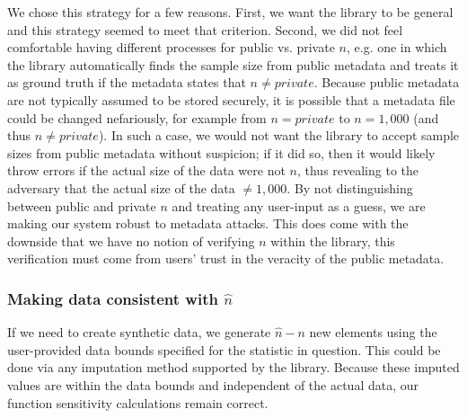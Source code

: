 \documentclass[11pt]{scrartcl} %
\begin{document}
We chose this strategy for a few reasons. First, we want the library to be general and this strategy
seemed to meet that criterion. Second, we did not feel comfortable having different processes for
public vs. private $n$, e.g. one in which the library automatically finds the sample size from public metadata and treats
it as ground truth if the metadata states that $n \neq private$.
Because public metadata are not typically assumed to be stored securely, it is
possible that a metadata file could be changed nefariously, for example from $n = private$ to $n = 1,000$
(and thus $n \neq private$).
In such a case, we would not want the library to accept sample sizes from public metadata without
suspicion; if it did so, then it would likely throw errors if the actual size of the data were not $n$, thus
revealing to the adversary that the actual size of the data $\neq 1,000$.
By not distinguishing between public and private $n$ and treating any user-input as a guess,
we are making our system robust to metadata attacks.
This does come with the downside that we have no notion of verifying $n$ within the library, this
verification must come from users' trust in the veracity of the public metadata.


\subsubsection{Making data consistent with $\hat{n}$}
If we need to create synthetic data, we generate $\hat{n} - n$ new elements using
the user-provided data bounds specified for the statistic in question.
This could be done via any imputation method supported by the library.
Because these imputed values are within the data bounds and independent of the actual data,
our function sensitivity calculations remain correct. \newline
\end{document}
